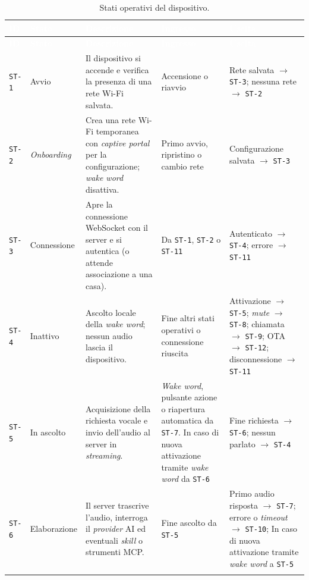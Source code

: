 \documentclass[12pt,a4paper]{article}
\newcommand{\thc}[1]{\textcolor{white}{\textbf{#1}}}
\newcommand{\rl}{\\ \arrayrulecolor{bfline}\hline}
\begin{document}
\begin{longtable}{>{\raggedright\arraybackslash}p{}>{\raggedright\arraybackslash\hspace{0pt}}p{}>{\raggedright\arraybackslash}p{}>{\raggedright\arraybackslash}p{}>{\raggedright\arraybackslash}p{}}
\caption{Stati operativi del dispositivo.}\label{tab:stati}\\
\rowcolor{bfblue}\thc{ID} & \thc{Stato} & \thc{Descrizione} & \thc{Ingresso} & \thc{Uscita} \\
\endfirsthead
\rowcolor{bfblue}\thc{ID} & \thc{Stato} & \thc{Descrizione} & \thc{Ingresso} & \thc{Uscita} \\
\endhead
\texttt{ST-1} & Avvio & Il dispositivo si accende e verifica la presenza di una rete Wi-Fi salvata. & Accensione o riavvio & Rete salvata $\rightarrow$ \texttt{ST-3}; nessuna rete $\rightarrow$ \texttt{ST-2} \rl
\texttt{ST-2} & \emph{Onboarding} & Crea una rete Wi-Fi temporanea con \emph{captive portal} per la configurazione; \emph{wake word} disattiva. & Primo avvio, ripristino o cambio rete & Configurazione salvata $\rightarrow$ \texttt{ST-3} \rl
\texttt{ST-3} & Connessione & Apre la connessione WebSocket con il server e si autentica (o attende associazione a una casa). & Da \texttt{ST-1}, \texttt{ST-2} o \texttt{ST-11} & Autenticato $\rightarrow$ \texttt{ST-4}; errore $\rightarrow$ \texttt{ST-11} \rl
\texttt{ST-4} & Inattivo & Ascolto locale della \emph{wake word}; nessun audio lascia il dispositivo. & Fine altri stati operativi o connessione riuscita & Attivazione $\rightarrow$ \texttt{ST-5}; \emph{mute} $\rightarrow$ \texttt{ST-8}; chiamata $\rightarrow$ \texttt{ST-9}; OTA $\rightarrow$ \texttt{ST-12}; disconnessione $\rightarrow$ \texttt{ST-11} \rl
\texttt{ST-5} & In ascolto & Acquisizione della richiesta vocale e invio dell'audio al server in \emph{streaming}. & \emph{Wake word}, pulsante azione o riapertura automatica da \texttt{ST-7}. In caso di nuova attivazione tramite \emph{wake word} da \texttt{ST-6}  & Fine richiesta $\rightarrow$ \texttt{ST-6}; nessun parlato $\rightarrow$ \texttt{ST-4} \rl
\texttt{ST-6} & Elaborazione & Il server trascrive l'audio, interroga il \emph{provider} AI ed eventuali \emph{skill} o strumenti MCP. & Fine ascolto da \texttt{ST-5} & Primo audio risposta $\rightarrow$ \texttt{ST-7}; errore o \emph{timeout} $\rightarrow$ \texttt{ST-10};  In caso di nuova attivazione tramite \emph{wake word} a \texttt{ST-5} \rl

\end{longtable}
\end{document}
